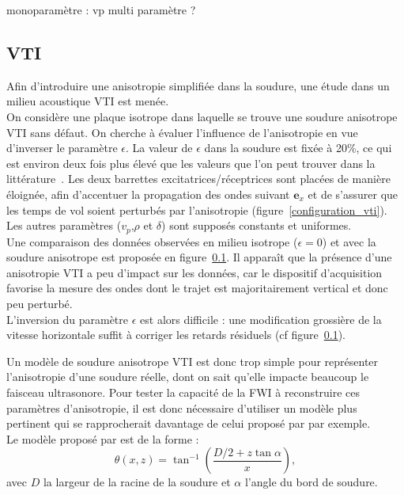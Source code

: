 monoparamètre : vp
multi paramètre ?



\subsection{VTI}
Afin d'introduire une anisotropie simplifiée dans la soudure, une étude dans un milieu acoustique VTI est menée.\\

On considère une plaque isotrope dans laquelle se trouve une soudure anisotrope VTI sans défaut. On cherche à évaluer l'influence de l'anisotropie en vue d'inverser le paramètre $\epsilon$. La valeur de $\epsilon$ dans la soudure est fixée à 20\%, ce qui est environ deux fois plus élevé que les valeurs que l'on peut trouver dans la littérature~\citep{chassignole}. Les deux barrettes excitatrices/réceptrices sont placées de manière éloignée, afin d'accentuer la propagation des ondes suivant $\bm{e}_{x}$ et de s'assurer que les temps de vol soient perturbés par l'anisotropie (figure~\ref{configuration_vti}).\\
Les autres paramètres ($v_{p}$,$\rho$ et $\delta$) sont supposés constants et uniformes.\\

Une comparaison des données observées en milieu isotrope ($\epsilon = 0$) et avec la soudure anisotrope est proposée en figure~\ref{}. Il apparaît que la présence d'une anisotropie VTI a peu d'impact sur les données, car le dispositif d'acquisition favorise la mesure des ondes dont le trajet est majoritairement vertical et donc peu perturbé.\\
 L'inversion du paramètre $\epsilon$ est alors difficile : une modification grossière de la vitesse horizontale suffit à corriger les retards résiduels (cf figure~\ref{}).
 
 
Un modèle de soudure anisotrope VTI est donc trop simple pour représenter l'anisotropie d'une soudure réelle, dont on sait qu'elle impacte beaucoup le faisceau ultrasonore. Pour tester la capacité de la FWI à reconstruire ces paramètres d'anisotropie, il est donc nécessaire d'utiliser un modèle plus pertinent qui se rapprocherait davantage de celui proposé par \cite{ogilvy} par exemple.\\

Le modèle proposé par \cite{ogilvy} est de la forme : 
\begin{equation}
	\theta(x,z) = \tan^{-1}\left( \frac{D/2 + z\tan\alpha}{x} \right),
\end{equation}
avec $D$ la largeur de la racine de la soudure et $\alpha$  l'angle du bord de soudure.

